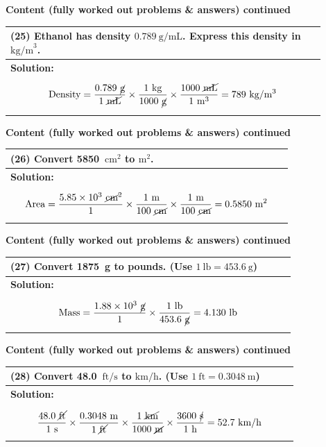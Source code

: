 \documentclass{article}
\begin{document}
\newpage
\noindent
{\large \textbf{Content (fully worked out problems \& answers) continued}} \\[0.2em]
\begin{tabular}{|p{0.9\linewidth}|}
\hline
\vspace{0.2cm}

\textbf{(25)} Ethanol has density $0.789~\text{g/mL}$. Express this density in $\text{kg/m}^3$. \\
\hline
\textbf{Solution:} \\
\[
\text{Density} = \frac{0.789~\cancel{\text{g}}}{1~\cancel{\text{mL}}} \times \frac{1~\text{kg}}{1000~\cancel{\text{g}}} \times \frac{1000~\cancel{\text{mL}}}{1~\text{m}^3} = 789~\text{kg}/{\text{m}^3}
\]
\\
\hline
\end{tabular}
\newpage
\noindent
{\large \textbf{Content (fully worked out problems \& answers) continued}} \\[0.2em]
\begin{tabular}{|p{0.9\linewidth}|}
\hline
\vspace{0.2cm}

\textbf{(26)} Convert 5850~$\text{cm}^2$ to $\text{m}^2$. \\
\hline
\textbf{Solution:} \\
\[
\text{Area} = \frac{5.85 \times 10^3~\cancel{\text{cm}}^2}{1} \times \frac{1~\text{m}}{100~\cancel{\text{cm}}} \times \frac{1~\text{m}}{100~\cancel{\text{cm}}} = 0.5850 ~\text{m}^2
\]
\\
\hline
\end{tabular}
\newpage
\noindent
{\large \textbf{Content (fully worked out problems \& answers) continued}} \\[0.2em]
\begin{tabular}{|p{0.9\linewidth}|}
\hline
\vspace{0.2cm}

\textbf{(27)} Convert 1875~g to pounds. (Use $1~\text{lb}=453.6~\text{g}$) \\
\hline
\textbf{Solution:} \\
\[
\text{Mass} = \frac{1.88 \times 10^3~\cancel{\text{g}}}{1} \times \frac{1~\text{lb}}{453.6~\cancel{\text{g}}} = 4.130~\text{lb}
\]
\\
\hline
\end{tabular}
\newpage
\noindent
{\large \textbf{Content (fully worked out problems \& answers) continued}} \\[0.2em]
\begin{tabular}{|p{0.9\linewidth}|}
\hline
\vspace{0.2cm}

\textbf{(28)} Convert 48.0~$\text{ft/s}$ to $\text{km/h}$. (Use $1~\text{ft}=0.3048~\text{m}$) \\
\hline
\textbf{Solution:} \\
\[
\frac{48.0~\cancel{\text{ft}}}{1~\text{s}} \times \frac{0.3048~\text{m}}{1~\cancel{\text{ft}}} \times \frac{1~\cancel{\text{km}}}{1000~\cancel{\text{m}}} \times \frac{3600~\cancel{\text{s}}}{1~\text{h}} = 52.7~\text{km/h}
\]
\\
\hline
\end{tabular}
\end{document}

